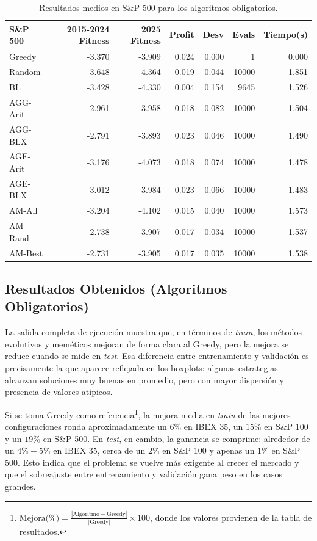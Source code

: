 \begin{table}[H]
\centering
\scriptsize
\begin{tabular}{@{}lrrrrrr@{}}
\toprule
\textbf{S\&P 500} & \textbf{2015-2024 Fitness} & \textbf{2025 Fitness} & \textbf{Profit} & \textbf{Desv} & \textbf{Evals} & \textbf{Tiempo(s)} \\
\midrule
Greedy    & -3.370 & -3.909 & 0.024 & 0.000 & 1     & 0.000 \\
Random    & -3.648 & -4.364 & 0.019 & 0.044 & 10000 & 1.851 \\
BL        & -3.428 & -4.330 & 0.004 & 0.154 & 9645  & 1.526 \\
AGG-Arit  & -2.961 & -3.958 & 0.018 & 0.082 & 10000 & 1.504 \\
AGG-BLX   & -2.791 & -3.893 & 0.023 & 0.046 & 10000 & 1.490 \\
AGE-Arit  & -3.176 & -4.073 & 0.018 & 0.074 & 10000 & 1.478 \\
AGE-BLX   & -3.012 & -3.984 & 0.023 & 0.066 & 10000 & 1.483 \\
AM-All    & -3.204 & -4.102 & 0.015 & 0.040 & 10000 & 1.573 \\
AM-Rand   & -2.738 & -3.907 & 0.017 & 0.034 & 10000 & 1.537 \\
AM-Best   & -2.731 & -3.905 & 0.017 & 0.035 & 10000 & 1.538 \\
\bottomrule
\end{tabular}
\caption{Resultados medios en S\&P 500 para los algoritmos obligatorios.}
\label{tab:sp500-oblig}
\end{table}

\subsection{Resultados Obtenidos (Algoritmos Obligatorios)}

La salida completa de ejecución muestra que, en términos de \textit{train}, los
métodos evolutivos y meméticos mejoran de forma clara al Greedy, pero la mejora
se reduce cuando se mide en \textit{test}. Esa diferencia entre entrenamiento y
validación es precisamente la que aparece reflejada en los boxplots: algunas
estrategias alcanzan soluciones muy buenas en promedio, pero con mayor
dispersión y presencia de valores atípicos.

Si se toma Greedy como referencia\footnote{$\text{Mejora(\%)} = \frac{|\text{Algoritmo} - \text{Greedy}|}{|\text{Greedy}|} \times 100$, donde los valores provienen de la tabla de resultados.}, la mejora media en \textit{train} de las
mejores configuraciones ronda aproximadamente un \(6\%\) en IBEX 35, un
\(15\%\) en S\&P 100 y un \(19\%\) en S\&P 500. En \textit{test}, en cambio,
la ganancia se comprime: alrededor de un \(4\%-5\%\) en IBEX 35, cerca de un
\(2\%\) en S\&P 100 y apenas un \(1\%\) en S\&P 500. Esto indica que el
problema se vuelve más exigente al crecer el mercado y que el sobreajuste entre
entrenamiento y validación gana peso en los casos grandes.

